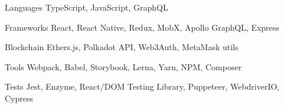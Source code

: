 

\begin{cvskills}

  \cvskill
    {Languages} %
    {TypeScript, JavaScript, GraphQL} %

  \cvskill
    {Frameworks} %
    {React, React Native, Redux, MobX, Apollo GraphQL, Express} %

  \cvskill
    {Blockchain} %
    {Ethers.js, Polkadot API, Web3Auth, MetaMask utils} %

  \cvskill
    {Tools} %
    {Webpack, Babel, Storybook, Lerna, Yarn, NPM, Composer} %

  \cvskill
    {Tests} %
    {Jest, Enzyme, React/DOM Testing Library, Puppeteer, WebdriverIO, Cypress} %

\end{cvskills}
